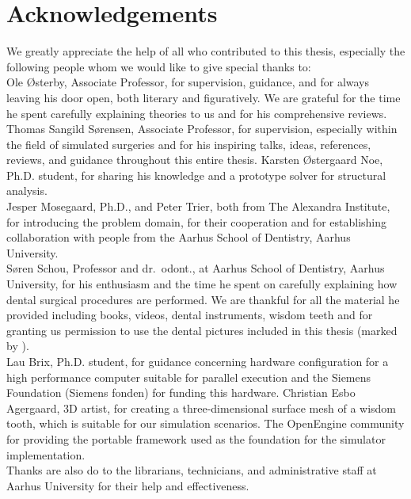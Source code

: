 
\chapter*{Acknowledgements}
We greatly appreciate the help of all who contributed to this thesis,
especially the following people whom we would like to give special
thanks to: \\ 

Ole Østerby, Associate Professor, for supervision, guidance, and
for always leaving his door open, both literary and figuratively. We
are grateful for the time he spent carefully explaining theories
to us and for his comprehensive reviews. 
%
Thomas Sangild Sørensen, Associate Professor, for supervision,
especially within the field
of simulated surgeries and for his inspiring talks, ideas,
references, reviews, and guidance throughout this entire thesis.
%
Karsten Østergaard Noe, Ph.D. student, for sharing his knowledge and
a prototype solver for structural analysis. \\

Jesper Mosegaard, Ph.D., and Peter Trier, both from The Alexandra
Institute, for introducing the problem domain, for their cooperation and
for establishing collaboration with people from the Aarhus School of
Dentistry, Aarhus University. \\

Søren Schou, Professor and dr.~odont., at Aarhus School of Dentistry, Aarhus
University, for his enthusiasm and the time he spent on carefully
explaining how dental surgical procedures are performed. We are
thankful for all the material he provided including books, videos,
dental instruments, wisdom teeth and for granting us permission to
use the dental pictures included in this thesis (marked by \textdagger). \\

Lau Brix, Ph.D. student, for guidance concerning hardware
configuration for a high performance computer suitable for parallel
execution
%
and the Siemens Foundation (Siemens fonden) for funding this
hardware.
%
Christian Esbo Agergaard, 3D artist, for creating a three-dimensional
surface mesh of a wisdom tooth, which is suitable for our simulation
scenarios.
%
The OpenEngine community for providing the portable framework used as
the foundation for the simulator implementation. \\

Thanks are also do to the librarians, technicians, and administrative
staff at Aarhus University for their help and effectiveness.
